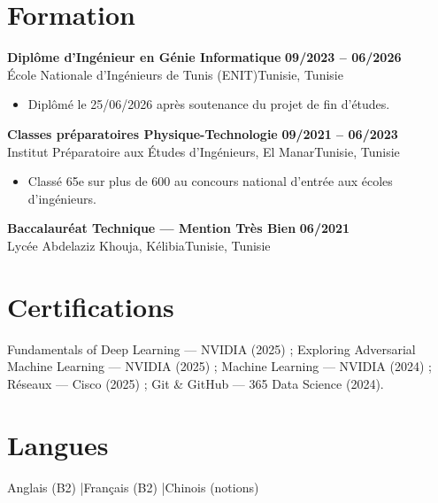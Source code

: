 \documentclass[a4paper,10pt]{article}
\newcommand{\cventry}[4]{%
  \textbf{#1} \hfill \textbf{#4}\\[1pt]
  #2{\ifx\relax#3\relax\else, #3\fi}\par\vspace{2pt}}
\begin{document}
\section{Formation}
\cventry{Diplôme d'Ingénieur en Génie Informatique}{École Nationale d'Ingénieurs de Tunis (ENIT)}{Tunisie}{09/2023 -- 06/2026}
\begin{itemize}
  \item Diplômé le 25/06/2026 après soutenance du projet de fin d'études.
\end{itemize}
\cventry{Classes préparatoires Physique-Technologie}{Institut Préparatoire aux Études d'Ingénieurs, El Manar}{Tunisie}{09/2021 -- 06/2023}
\begin{itemize}
  \item Classé 65e sur plus de 600 au concours national d'entrée aux écoles d'ingénieurs.
\end{itemize}
\cventry{Baccalauréat Technique — Mention Très Bien}{Lycée Abdelaziz Khouja, Kélibia}{Tunisie}{06/2021}

\section{Certifications}
Fundamentals of Deep Learning — NVIDIA (2025) ; Exploring Adversarial Machine Learning — NVIDIA (2025) ; Machine Learning — NVIDIA (2024) ; Réseaux — Cisco (2025) ; Git \& GitHub — 365 Data Science (2024).

\section{Langues}
Anglais (B2) \quad|\quad Français (B2) \quad|\quad Chinois (notions)
\end{document}
